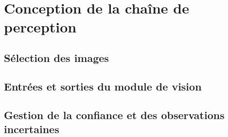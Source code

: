 
\section{Conception de la chaîne de perception}


\subsection{Sélection des images}

\subsection{Entrées et sorties du module de vision}

\subsection{Gestion de la confiance et des observations incertaines}
